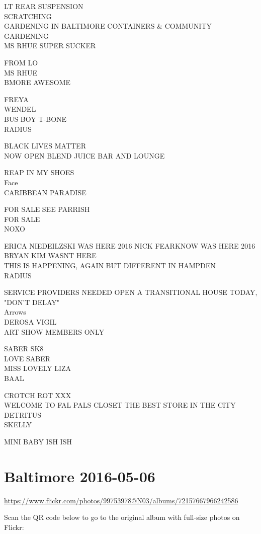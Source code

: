 \documentclass[10pt,letterpaper]{article}
\begin{document}
LT REAR SUSPENSION\\
SCRATCHING\\
GARDENING IN BALTIMORE CONTAINERS \& COMMUNITY GARDENING\\
MS RHUE SUPER SUCKER

FROM LO\\
MS RHUE\\
BMORE AWESOME

FREYA\\
WENDEL\\
BUS BOY T{-}BONE\\
RADIUS

BLACK LIVES MATTER\\
NOW OPEN BLEND JUICE BAR AND LOUNGE

REAP IN MY SHOES\\
Face\\
CARIBBEAN PARADISE

FOR SALE SEE PARRISH\\
FOR SALE\\
NOXO

ERICA NIEDEILZSKI WAS HERE 2016 NICK FEARKNOW WAS HERE 2016 BRYAN KIM WASNT HERE\\
THIS IS HAPPENING, AGAIN BUT DIFFERENT IN HAMPDEN\\
RADIUS

SERVICE PROVIDERS NEEDED OPEN A TRANSITIONAL HOUSE TODAY, "DON'T DELAY"\\
Arrows\\
DEROSA VIGIL\\
ART SHOW MEMBERS ONLY

SABER SK8\\
LOVE SABER\\
MISS LOVELY LIZA\\
BAAL

CROTCH ROT XXX\\
WELCOME TO FAL PALS CLOSET THE BEST STORE IN THE CITY\\
DETRITUS\\
SKELLY

MINI BABY ISH ISH


\section*{Baltimore 2016-05-06}

\url{https://www.flickr.com/photos/99753978@N03/albums/72157667966242586}

Scan the QR code below to go to the original album with full-size photos on Flickr:
\end{document}
